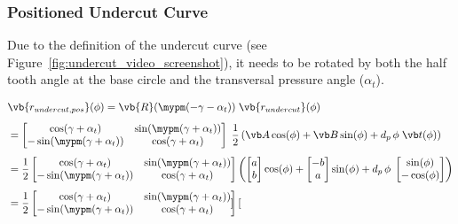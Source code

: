 \subsubsection{Positioned Undercut Curve}

Due to the definition of the undercut curve (see Figure~\ref{fig:undercut_video_screenshot}), it needs to be rotated by both the half tooth angle at the base circle and the transversal pressure angle ($\alpha_t$).

\begin{subequations}
\begin{align}
    &\vb{r_{undercut,pos}}(\phi) = \vb{R}(\mypm(-\gamma - \alpha_t))\;\vb{r_{undercut}}(\phi)
\\[1ex]
    &= \begin{bmatrix}
            \cos(\gamma+\alpha_t) & \sin(\mypm(\gamma+\alpha_t)) \\
            -\sin(\mypm(\gamma+\alpha_t)) & \cos(\gamma+\alpha_t)
        \end{bmatrix}
        \;\frac{1}{2}\left(
            \vb A \cos(\phi) + \vb B \sin(\phi) + d_p\,\phi\;\vb t(\phi)
        \right)
\\[1ex]
    &= \frac{1}{2}\begin{bmatrix}
            \cos(\gamma+\alpha_t) & \sin(\mypm(\gamma+\alpha_t)) \\
            -\sin(\mypm(\gamma+\alpha_t)) & \cos(\gamma+\alpha_t)
        \end{bmatrix}
        \left(
            \begin{bmatrix}
                a \\ b
            \end{bmatrix} \cos(\phi)
            + \begin{bmatrix}
                -b \\ a
            \end{bmatrix} \sin(\phi)
            + d_p\,\phi\; \begin{bmatrix}
                \sin(\phi) \\ -\cos(\phi)
            \end{bmatrix}
        \right)
\\[1ex]
    &= \frac{1}{2} \begin{bmatrix}
            \cos(\gamma+\alpha_t) & \sin(\mypm(\gamma+\alpha_t)) \\
            -\sin(\mypm(\gamma+\alpha_t)) & \cos(\gamma+\alpha_t)
        \end{bmatrix}
        \begin{bmatrix}

\end{bmatrix}
\end{align}
\end{subequations}
